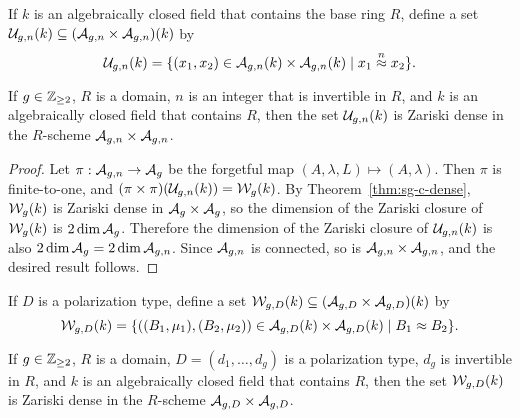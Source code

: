\documentclass{amsart}
\begin{document}
If $k$ is an algebraically closed field that contains the base ring $R$, define a set $\mathcal{U}_{g,n}(k)  \subseteq (\mathcal{A}_{g,n} \times \mathcal{A}_{g,n})(k)$ by
\[
\mg(k) =  \{(x_1,x_2) \in \agn(k) \times \agn(k) \mid x_1 \medium x_2 \}. %
\]
\begin{proposition}\label{prop:medium-isomorphic}
  If $g\in\mathbb{Z}_{\ge 2}$, $R$ is a domain, $n$ is an integer that is invertible in $R$, and $k$ is an algebraically closed field that contains $R$, then the set $\mathcal{U}_{g,n}(k)$ 
  is Zariski dense in the $R$-scheme $\mathcal{A}_{g,n} \times \mathcal{A}_{g,n}$.
\end{proposition}

\begin{proof}
  Let $\pi: \mathcal{A}_{g,n} \to \mathcal{A}_g$ be the forgetful map $(A,\lambda,L) \mapsto (A,\lambda)$. Then $\pi$ is finite-to-one, and $(\pi\times\pi)(\mathcal{U}_{g,n}(k)) = \mathcal{W}_g(k)$. By Theorem~\ref{thm:sg-c-dense}, $\mathcal{W}_g(k)$ is Zariski dense in $\mathcal{A}_g \times \mathcal{A}_g$, so the dimension of the Zariski closure of $\mathcal{W}_g(k)$ is $2 \dim \mathcal{A}_g$. Therefore the dimension of the Zariski closure of $\mathcal{U}_{g,n}(k)$ is also $2 \dim \mathcal{A}_g = 2 \dim \mathcal{A}_{g,n}$. Since $\mathcal{A}_{g,n}$ is connected, so is $\mathcal{A}_{g,n} \times \mathcal{A}_{g,n}$, and the desired result follows.
\end{proof}

If $D$ is a polarization type, define a set $\mathcal{W}_{g,D}(k)  \subseteq (\mathcal{A}_{g,{D}} \times \mathcal{A}_{g,{D}})(k)$ by
\[
\mathcal{W}_{g,D}(k) =  \{((B_1,\mu_1), (B_2, \mu_2)) \in \mathcal{A}_{g,{D}}(k) \times \mathcal{A}_{g,{D}}(k) \mid B_1 \approx B_2 \}. 
\]

\begin{proposition}
\label{prop:whatever}
  If $g\in\mathbb{Z}_{\ge 2}$, $R$ is a domain,  $D=(d_1,\ldots,d_g)$ is a polarization type, $d_g$ is invertible in $R$, and $k$ is an algebraically closed field that contains $R$, then the set $\mathcal{W}_{g,D}(k)$ 
is Zariski dense in the $R$-scheme $\mathcal{A}_{g,{D}} \times \mathcal{A}_{g,{D}}$.
\end{proposition}
\end{document}
